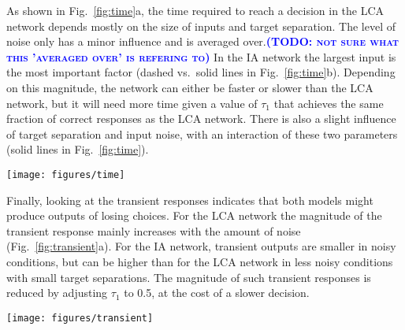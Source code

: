 \documentclass[10pt,letterpaper]{article}
\makeatletter
\newcommand{\todo}[1]{\textbf{\textsc{\textcolor{blue}{(TODO\@: #1)}}}}
\makeatother
\begin{document}
As shown in Fig.~\ref{fig:time}a, the time required to reach a decision in the LCA network depends mostly on the size of inputs and target separation.
The level of noise only has a minor influence and is averaged over.\todo{not sure what this 'averaged over' is refering to}
In the IA network the largest input is the most important factor (dashed vs.\ solid lines in Fig.~\ref{fig:time}b).
Depending on this magnitude, the network can either be faster or slower than the LCA network, but it will need more time given a value of $\tau_1$ that achieves the same fraction of correct responses as the LCA network.
There is also a slight influence of target separation and input noise, with an interaction of these two parameters (solid lines in Fig.~\ref{fig:time}).
\begin{figure*}[t]
    \centering
    \texttt{[image: figures/time]}
    \caption{
        \todo{Can you make it so that the left / right subfigures are aligned with the left / right columns? Currently the left subfigure stretches over the center dividing line.}
        (Left) Mean decision times for the LCA network.
        Shown data is averaged across all noise levels, since noise had minimal effect on decision times.
        (Right) Mean decision times for the IA network with input magnitude $u = 0.2$ (solid) and $u = 1$ (dashed).
        Error bars denote bootstrapped 95\% confidence intervals.
    }\label{fig:time}
\end{figure*}


Finally, looking at the transient responses indicates that both models might produce outputs of losing choices.
For the LCA network the magnitude of the transient response mainly increases with the amount of noise (Fig.~\ref{fig:transient}a).
For the IA network, transient outputs are smaller in noisy conditions, but can be higher than for the LCA network in less noisy conditions with small target separations.
The magnitude of such transient responses is reduced by adjusting $\tau_1$ to 0.5, at the cost of a slower decision.
\begin{figure*}
    \centering
    \texttt{[image: figures/transient]}
    \caption{
        Transient response (highest output of losing choices) for the LCA and IA network.
        Error bars denote bootstrapped 95\% confidence intervals.
        The grey horizontal lines show the optimum.
    }\label{fig:transient}
\end{figure*}
\end{document}
